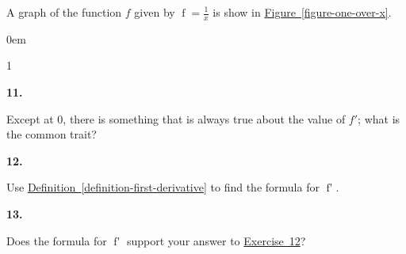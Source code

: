 \documentclass[12pt,]{book}
\theoremstyle{plain}
\theoremstyle{definition}
\numberwithin{equation}{section}
\newcounter{figstack}
\newcounter{figindex}
\newlength\fight
\newcommand\pushValignCaptionBottom[5][b]{%
\stepcounter{figstack}%
\expandafter\def\csname %
figalign\romannumeral\value{figstack}\endcsname{#1}%
\expandafter\def\csname %
figtype\romannumeral\value{figstack}\endcsname{#2}%
\expandafter\def\csname %
figwd\romannumeral\value{figstack}\endcsname{#3}%
\expandafter\def\csname %
figcontent\romannumeral\value{figstack}\endcsname{#4}%
\expandafter\def\csname %
figcap\romannumeral\value{figstack}\endcsname{#5}%
\setbox0=\hbox{%
\begin{#2}{#3}#4\end{#2}}%
\ifdim\dimexpr\ht0+\dp0\relax>\fight\global\setlength{\fight}{%
\dimexpr\ht0+\dp0\relax}\fi%
}
\newcommand\popValignCaptionBottom{%
\setcounter{figindex}{0}%
\hfill%
\whiledo{\value{figindex}<\value{figstack}}{%
\stepcounter{figindex}%
\def\tmp{\csname figwd\romannumeral\value{figindex}\endcsname}%
\begin{\csname figtype\romannumeral\value{figindex}\endcsname}[t]{\tmp}%
\centering%
\stackinset{c}{}%
{\csname figalign\romannumeral\value{figindex}\endcsname}{}%
{\csname figcontent\romannumeral\value{figindex}\endcsname}%
{\rule{0pt}{\fight}}\par%
\csname figcap\romannumeral\value{figindex}\endcsname%
\end{\csname figtype\romannumeral\value{figindex}\endcsname}%
\hfill%
}%
\setcounter{figstack}{0}%
\setlength{\fight}{0pt}%
\hfill%
}
\newenvironment{exercisegroup}%
{\medskip\noindent}%
{\par\bigskip}%
\newlength{\exercisegroupindent}%
\newlength{\exercisegroupitemwidth}%
\newenvironment{exercisegrouplist}%
{\vspace{-\partopsep}%
\begin{adjustwidth}{\exercisegroupindent}{0em}}%
{\end{adjustwidth}%
\vspace{-\partopsep}%
\vspace{\baselineskip}}%
\newenvironment{exercisegroupbycol}[1]%
{\begin{exercisegrouplist}%
\vspace{-\multicolsep}%
\begin{multicols}{#1}%
\setlength{\parindent}{0em}%
\setlength{\exercisegroupitemwidth}{\linewidth}}%
{\end{multicols}%
\vspace{-\multicolsep}%
\end{exercisegrouplist}}%
\newenvironment{exercisegroupitem}[1]%
{\begin{minipage}[t]{\exercisegroupitemwidth}
\vspace{0pt}%
{\bfseries#1}%
\rule{0pt}{\baselineskip}}{\strut%
\end{minipage}%
\hspace{\columnsep}}%
\providecommand\phantomsection{}
\newcommand{\fe}[2]{\mathop{{#1}{\left(#2\right)}}}
\newcommand{\fd}[1]{#1'}
\begin{document}
\begin{exerciselist}
\begin{exercisegroup}%
A graph of the function \(f\) given by \(\fe{f}{x}=\frac{1}{x}\) is show in \hyperref[figure-one-over-x]{Figure~\ref*{figure-one-over-x}}.%
\begin{exercisegroupbycol}{1}%
\begin{exercisegroupitem}{11. }\phantomsection\hypertarget{exercise-negative-derivative-of-one-over-x}{\null}
Except at \(0\), there is something that is always true about the value of \(\fd{f}\); what is the common trait?%
\end{exercisegroupitem}%
\par%
\begin{exercisegroupitem}{12. }\phantomsection\hypertarget{exercise-derivative-of-one-over-x}{\null}
Use \hyperref[definition-first-derivative]{Definition~\ref*{definition-first-derivative}} to find the formula for \(\fe{\fd{f}}{x}\).%
\end{exercisegroupitem}%
\par%
\begin{exercisegroupitem}{13. }\phantomsection\hypertarget{exercise-165}{\null}
Does the formula for \(\fe{\fd{f}}{x}\) support your answer to \hyperref[exercise-derivative-of-one-over-x]{Exercise~12}?%

\end{exercisegroupitem}
\end{exercisegroupbycol}
\end{exercisegroup}
\end{exerciselist}
\end{document}
